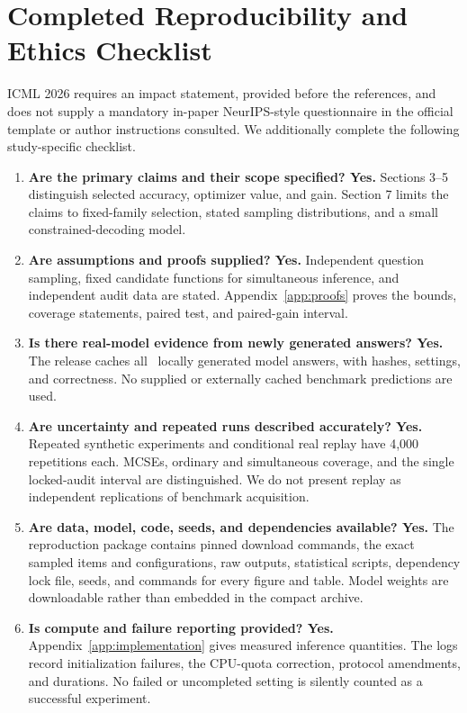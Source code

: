 \documentclass{article}
\begin{document}
\section{Completed Reproducibility and Ethics Checklist}
ICML 2026 requires an impact statement, provided before the references, and does not supply a mandatory in-paper NeurIPS-style questionnaire in the official template or author instructions consulted. We additionally complete the following study-specific checklist.
\begin{enumerate}
\item \textbf{Are the primary claims and their scope specified? Yes.} Sections 3--5 distinguish selected accuracy, optimizer value, and gain. Section 7 limits the claims to fixed-family selection, stated sampling distributions, and a small constrained-decoding model.
\item \textbf{Are assumptions and proofs supplied? Yes.} Independent question sampling, fixed candidate functions for simultaneous inference, and independent audit data are stated. Appendix~\ref{app:proofs} proves the bounds, coverage statements, paired test, and paired-gain interval.
\item \textbf{Is there real-model evidence from newly generated answers? Yes.} The release caches all \TotalResponses\ locally generated model answers, with hashes, settings, and correctness. No supplied or externally cached benchmark predictions are used.
\item \textbf{Are uncertainty and repeated runs described accurately? Yes.} Repeated synthetic experiments and conditional real replay have 4,000 repetitions each. MCSEs, ordinary and simultaneous coverage, and the single locked-audit interval are distinguished. We do not present replay as independent replications of benchmark acquisition.
\item \textbf{Are data, model, code, seeds, and dependencies available? Yes.} The reproduction package contains pinned download commands, the exact sampled items and configurations, raw outputs, statistical scripts, dependency lock file, seeds, and commands for every figure and table. Model weights are downloadable rather than embedded in the compact archive.
\item \textbf{Is compute and failure reporting provided? Yes.} Appendix~\ref{app:implementation} gives measured inference quantities. The logs record initialization failures, the CPU-quota correction, protocol amendments, and durations. No failed or uncompleted setting is silently counted as a successful experiment.

\end{enumerate}
\end{document}

